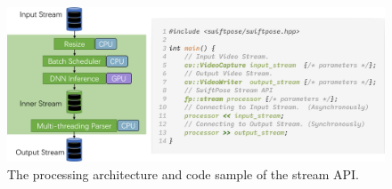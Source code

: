 \documentclass[twoside,11pt]{article}
\begin{document}
\begin{figure}[h]
\centering
\includegraphics[width=0.85\linewidth]{StreamAPI.png}
\caption{The processing architecture and code sample of the stream API.}
\label{fig:StreamAPI}
\end{figure}






\end{document}
